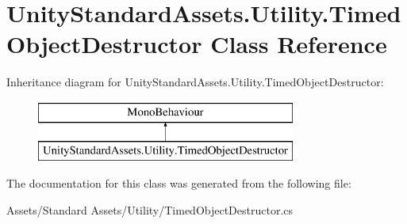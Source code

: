 \hypertarget{class_unity_standard_assets_1_1_utility_1_1_timed_object_destructor}{}\section{Unity\+Standard\+Assets.\+Utility.\+Timed\+Object\+Destructor Class Reference}
\label{class_unity_standard_assets_1_1_utility_1_1_timed_object_destructor}
Inheritance diagram for Unity\+Standard\+Assets.\+Utility.\+Timed\+Object\+Destructor\+:\begin{figure}[H]
\begin{center}
\leavevmode
\includegraphics[height=2.000000cm]{class_unity_standard_assets_1_1_utility_1_1_timed_object_destructor}
\end{center}
\end{figure}


The documentation for this class was generated from the following file\+:\begin{DoxyCompactItemize}
\item 
Assets/\+Standard Assets/\+Utility/Timed\+Object\+Destructor.\+cs\end{DoxyCompactItemize}
